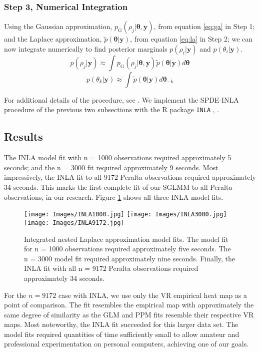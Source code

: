 \subsubsection{Step 3, Numerical Integration} %
Using the Gaussian approximation, $p_{\text{G}}(\rho_{j}|\pmb{\theta, y})$, from equation \ref{eq:ga} in Step 1; and the Laplace approximation, $\tilde{p}(\pmb{\theta}|\pmb{y})$, from equation \ref{eq:la} in Step 2; we can now integrate numerically to find posterior marginals $p(\rho_{i}|\pmb{y})$ and $p(\theta_{i}|\pmb{y})$. 
        $$ p(\rho_{j} | \pmb{y}) \approx \int p_{\text{G}}(\rho_{j}|\pmb{\theta, y})\tilde{p}(\pmb{\theta}|\pmb{y}) d\pmb{\theta} $$
        $$ p(\theta_{k} | \pmb{y}) \approx \int \tilde{p}(\pmb{\theta}|\pmb{y}) d\pmb{\theta}_{-k} $$
        
For additional details of the procedure, see \cite{Rue2009}. We implement the SPDE-INLA procedure of the previous two subsections with the R package \verb|INLA| \citep{INLA}, \citep{Lindgren2015}.
        
\subsection{Results}
The INLA model fit with n = 1000 observations required approximately 5 seconds; and the n = 3000 fit required approximately 9 seconds. Most impressively, the INLA fit to all 9172 Peralta observations required approximately 34 seconds. This marks the first complete fit of our SGLMM to all Peralta observations, in our research. Figure \ref{fig:INLA} shows all three INLA model fits.
  \begin{figure}[H]
	\centering 
	\texttt{[image: Images/INLA1000.jpg]}	
	\texttt{[image: Images/INLA3000.jpg]}
	\texttt{[image: Images/INLA9172.jpg]}
	\caption{Integrated nested Laplace approximation model fits. The model fit for n = 1000 observations required approximately five seconds. The n = 3000 model fit required approximately nine seconds. Finally, the INLA fit with all n = 9172 Peralta observations required approximately 34 seconds.}
	\label{fig:INLA}
	\end{figure}
For the $n = 9172$ case with INLA, we use only the VR empirical heat map as a point of comparison. The fit resembles the empirical map with approximately the same degree of similarity as the GLM and PPM fits resemble their respective VR maps. Most noteworthy, the INLA fit succeeded for this larger data set. The model fits required quantities of time sufficiently small to allow amateur and professional experimentation on personal computers, achieving one of our goals.


